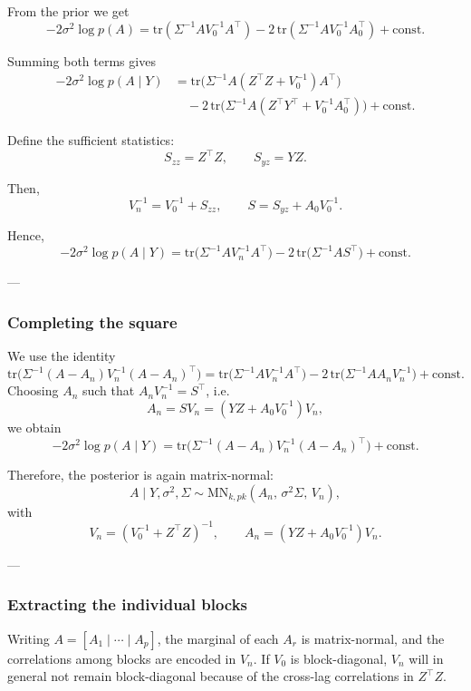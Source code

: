 From the prior we get
\[
-2\sigma^2 \log p(A)
= \mathrm{tr}(\Sigma^{-1} A V_0^{-1} A^\top)
- 2\, \mathrm{tr}(\Sigma^{-1} A V_0^{-1} A_0^\top) + \text{const.}
\]

Summing both terms gives
\[
\begin{aligned}
-2\sigma^2 \log p(A \mid Y)
&= \mathrm{tr}\!\big( \Sigma^{-1} A (Z^\top Z + V_0^{-1}) A^\top \big) \\
&\quad - 2\, \mathrm{tr}\!\big( \Sigma^{-1} A (Z^\top Y^\top + V_0^{-1} A_0^\top) \big)
+ \text{const.}
\end{aligned}
\]

Define the sufficient statistics:
\[
S_{zz} = Z^\top Z, \qquad S_{yz} = Y Z.
\]

Then,
\[
V_n^{-1} = V_0^{-1} + S_{zz}, \qquad
S = S_{yz} + A_0 V_0^{-1}.
\]

Hence,
\[
-2\sigma^2 \log p(A \mid Y)
= \mathrm{tr}\!\big(\Sigma^{-1} A V_n^{-1} A^\top\big)
- 2\, \mathrm{tr}\!\big(\Sigma^{-1} A S^\top\big) + \text{const.}
\]

---

\subsubsection{Completing the square}

We use the identity
\[
\mathrm{tr}\!\big(\Sigma^{-1}(A - A_n)V_n^{-1}(A - A_n)^\top\big)
= \mathrm{tr}\!\big(\Sigma^{-1}A V_n^{-1}A^\top\big)
- 2\,\mathrm{tr}\!\big(\Sigma^{-1}A A_n V_n^{-1}\big)
+ \text{const.}
\]
Choosing \(A_n\) such that \(A_n V_n^{-1} = S^\top\), i.e.
\[
\boxed{
A_n = S V_n = (Y Z + A_0 V_0^{-1}) V_n,
}
\]
we obtain
\[
-2\sigma^2 \log p(A \mid Y)
= \mathrm{tr}\!\big(\Sigma^{-1}(A - A_n)V_n^{-1}(A - A_n)^\top\big) + \text{const.}
\]

Therefore, the posterior is again matrix-normal:
\[
\boxed{
A \mid Y, \sigma^2, \Sigma
\sim
\mathrm{MN}_{k,pk}(A_n, \, \sigma^2 \Sigma, \, V_n),
}
\]
with
\[
\boxed{
V_n = (V_0^{-1} + Z^\top Z)^{-1}, \qquad
A_n = (Y Z + A_0 V_0^{-1}) V_n.
}
\]

---

\subsubsection{Extracting the individual blocks}

Writing \(A = [A_1 \mid \cdots \mid A_p]\), the marginal of each \(A_r\) is matrix-normal, and the correlations among blocks are encoded in \(V_n\).  
If \(V_0\) is block-diagonal, \(V_n\) will in general not remain block-diagonal because of the cross-lag correlations in \(Z^\top Z\).

